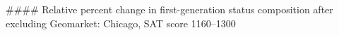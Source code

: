 #### Relative percent change in first-generation status composition after excluding Geomarket: Chicago, SAT score 1160–1300
